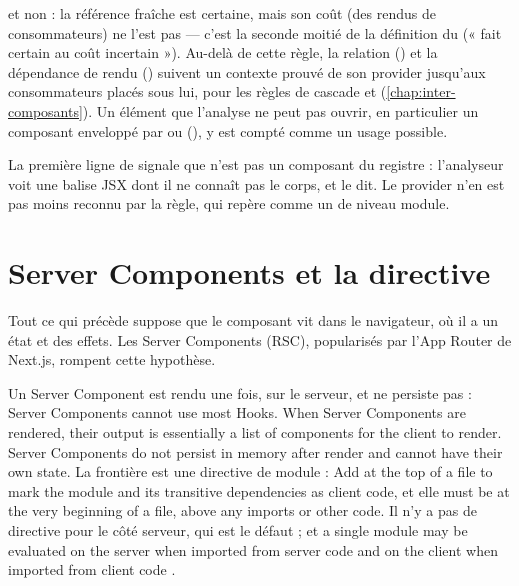 
\Warning{} et non \Error{} : la référence fraîche est certaine, mais son coût
(des rendus de consommateurs) ne l'est pas --- c'est la seconde moitié de la
définition du \Warning{} (« fait certain au coût incertain »). Au-delà de cette
règle, la relation  () et la dépendance de
rendu () suivent un contexte prouvé de son provider jusqu'aux
consommateurs placés sous lui, pour les règles de cascade
 et 
(\cref{chap:inter-composants}). Un élément que l'analyse ne peut pas ouvrir, en
particulier un composant enveloppé par  ou 
(), y est compté comme un usage possible.

\begin{remarque}
La première ligne  de  signale que
 n'est pas un composant du registre : l'analyseur voit
une balise JSX dont il ne connaît pas le corps, et le dit. Le provider n'en
est pas moins reconnu par la règle, qui repère  comme un
 de niveau module.
\end{remarque}

\section{Server Components et la directive }
\label{sec:react-modele-rsc}

Tout ce qui précède suppose que le composant vit dans le navigateur, où il a un
état et des effets. Les Server Components (RSC), popularisés par l'App Router
de Next.js, rompent cette hypothèse.

\begin{react}
Un Server Component est rendu une fois, sur le serveur, et ne persiste pas :
\og Server Components cannot use most Hooks. When Server Components are
rendered, their output is essentially a list of components for the client to
render. Server Components do not persist in memory after render and cannot
have their own state.\fg{} La frontière est une directive de module :
\og Add  at the top of a file to mark the module and its
transitive dependencies as client code\fg{}, et elle \og must be at the very
beginning of a file, above any imports or other code\fg{}. Il n'y a pas de
directive pour le côté serveur, qui est le défaut ; et \og a single module may
be evaluated on the server when imported from server code and on the client
when imported from client code\fg{} \cite{ReactDocs}.
\end{react}

